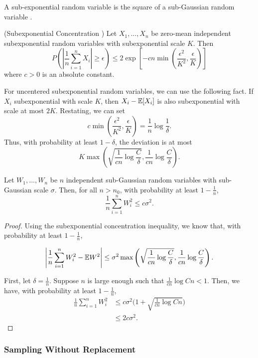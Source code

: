 \documentclass[12pt,pdftex,aos,noinfoline,addressasfootnote]{imsart}
\begin{document}
A sub-exponential random variable is the square of a sub-Gaussian random
variable \cite{vershynin2010introduction}.

\begin{proposition} (Subexponential Concentration
  \cite{vershynin2010introduction})
Let $X_1,...,X_n$ be zero-mean independent subexponential random
variables with subexponential scale $K$. 
Then
\[
P( | \frac{1}{n} \sum_{i=1}^n X_i | \geq \epsilon) \leq
	2 \exp \left[ -c n \min\left( \frac{\epsilon^2}{K^2}, \frac{\epsilon}{K} \right) \right]
\]
where $c > 0$ is an absolute constant.
\end{proposition}

For uncentered subexponential random variables, we can use the following fact. If $X_i$ subexponential with scale $K$, then $X_i - {\mathbb E}[X_i]$ is also subexponential with scale at most $2K$.
Restating, we can set
\[
c \min\left( \frac{\epsilon^2}{K^2}, \frac{\epsilon}{K} \right) = \frac{1}{n} \log \frac{1}{\delta}.
\]
Thus, with probability at least $1-\delta$, the deviation is at most
\[
K \max\left( \sqrt{\frac{1}{cn} \log \frac{C}{\delta}},  \frac{1}{cn} \log \frac{C}{\delta} \right).
\]


\begin{corollary}
Let $W_1,...,W_n$ be $n$ independent sub-Gaussian random variables with sub-Gaussian scale $\sigma$. 
Then, for all $n > n_0$, with probability at least $1- \frac{1}{n}$,
\[
\frac{1}{n} \sum_{i=1}^n W_i^2 \leq c \sigma^2 .
\]
\end{corollary}

\begin{proof}
Using the subexponential concentration inequality, we know that, with probability at least $1-\frac{1}{n}$, 

\[
\left| \frac{1}{n} \sum_{i=1}^n W_i^2 - {\mathbb E} W^2\right| \leq \sigma^2 \max\left( \sqrt{\frac{1}{cn} \log \frac{C}{\delta}}, \frac{1}{cn}\log \frac{C}{\delta} \right).
\]

First, let $\delta = \frac{1}{n}$. Suppose $n$ is large enough such that $ \frac{1}{cn} \log Cn < 1$. Then, we have, with probability at least $1-\frac{1}{n}$,
\begin{align*}
 \frac{1}{n} \sum_{i=1}^n W_i^2 &\leq c\sigma^2 \Big(1+\sqrt{\frac{1}{cn} \log Cn}\Big) \\
		&\leq 2 c \sigma^2.
 \end{align*}
\end{proof}


\subsubsection{Sampling Without Replacement}
\end{document}
